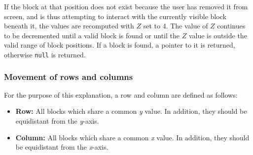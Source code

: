 If the block at that position does not exist because the user has removed it from screen, and is thus attempting to interact with the currently visible block beneath it, the values are recomputed with $Z$ set to 4. The value of $Z$ continues to be decremented until a valid block is found or until the $Z$ value is outside the valid range of block positions. If a block is found, a pointer to it is returned, otherwise \texttt{null} is returned.


\subsubsection{Movement of rows and columns}
For the purpose of this explanation, a row and column are defined as follows:

\begin{itemize}
	\item {\bf Row:} All blocks which share a common \emph{y} value. In addition, they should be equidistant from the \emph{y}-axis. 
	\item {\bf Column:} All blocks which share a common \emph{x} value. In addition, they should be equidistant from the \emph{x}-axis. 
\end {itemize}

